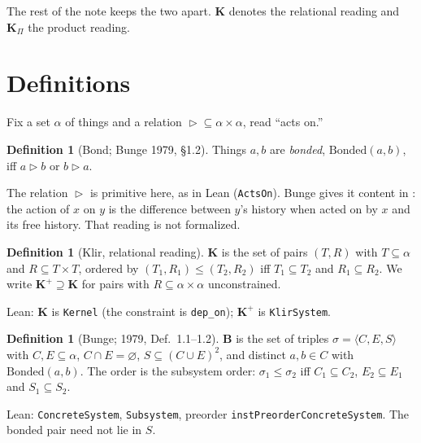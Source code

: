 \documentclass[11pt]{article}
\theoremstyle{definition}
\newtheorem{definition}[theorem]{Definition}
\theoremstyle{remark}
\newcommand{\K}{\mathbf{K}}
\newcommand{\Kp}{\mathbf{K}^{+}}
\newcommand{\KP}{\mathbf{K}_{\Pi}}
\newcommand{\B}{\mathbf{B}}
\newcommand{\acts}{\mathrel{\triangleright}}
\newcommand{\Bonded}{\mathrm{Bonded}}
\newcommand{\lean}[1]{\texttt{#1}}
\begin{document}
The rest of the note keeps the two apart. $\K$ denotes the relational reading and $\KP$ the product reading.

\section{Definitions}\label{sec:defs}

Fix a set $\alpha$ of things and a relation ${\acts}\subseteq\alpha\times\alpha$, read ``acts on.''

\begin{definition}[Bond; Bunge 1979, \S1.2]
Things $a,b$ are \emph{bonded}, $\Bonded(a,b)$, iff $a\acts b$ or $b\acts a$.
\end{definition}

The relation $\acts$ is primitive here, as in Lean (\lean{ActsOn}). Bunge gives it content in \cite[Def.~5.31]{bunge1977}: the action of $x$ on $y$ is the difference between $y$'s history when acted on by $x$ and its free history. That reading is not formalized.

\begin{definition}[Klir, relational reading]
$\K$ is the set of pairs $(T,R)$ with $T\subseteq\alpha$ and $R\subseteq T\times T$, ordered by $(T_1,R_1)\le(T_2,R_2)$ iff $T_1\subseteq T_2$ and $R_1\subseteq R_2$. We write $\Kp\supseteq\K$ for pairs with $R\subseteq\alpha\times\alpha$ unconstrained.
\end{definition}
\noindent Lean: $\K$ is \lean{Kernel} (the constraint is \lean{dep\_on}); $\Kp$ is \lean{KlirSystem}.

\begin{definition}[Bunge; 1979, Def.~1.1--1.2]
$\B$ is the set of triples $\sigma=\langle C,E,S\rangle$ with $C,E\subseteq\alpha$, $C\cap E=\varnothing$, $S\subseteq(C\cup E)^2$, and distinct $a,b\in C$ with $\Bonded(a,b)$. The order is the subsystem order: $\sigma_1\le\sigma_2$ iff $C_1\subseteq C_2$, $E_2\subseteq E_1$ and $S_1\subseteq S_2$.
\end{definition}
\noindent Lean: \lean{ConcreteSystem}, \lean{Subsystem}, preorder \lean{instPreorderConcreteSystem}. The bonded pair need not lie in $S$.
\end{document}
